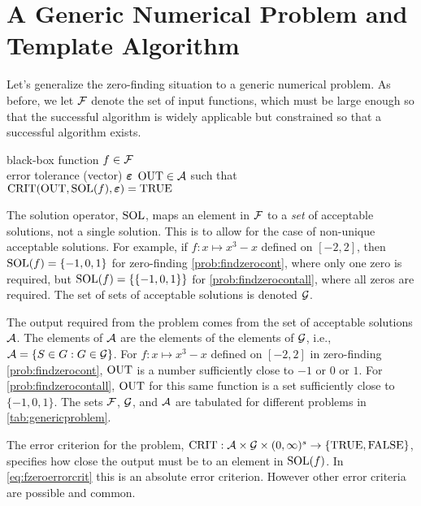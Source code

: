 \section{A Generic Numerical Problem and Template Algorithm}

Let's generalize the zero-finding situation to a generic numerical problem.  As before, we let $\mathcal{F}$ denote the set of input functions, which must be large enough so that the successful algorithm is widely applicable but constrained so that a successful algorithm exists. 

\begin{NumProblem}
\label{prob:generalProblem}
{black-box function $f \in \mathcal{F}$ \\ error tolerance (vector) $\boldsymbol{\varepsilon}$}
{$\operatorname{OUT} \in \mathcal{A}$ such that \\ \qquad $\operatorname{CRIT}(\operatorname{OUT},\operatorname{SOL}(f),\boldsymbol{\varepsilon}) = \textup{TRUE}$}
\end{NumProblem}

The solution operator, $\operatorname{SOL}$, maps an element in $\mathcal{F}$ to a \emph{set} of acceptable solutions, not a single solution. This is to allow for the case of non-unique acceptable solutions. For example, if $f: x \mapsto x^3 - x$ defined on $[-2,2]$, then $\operatorname{SOL}(f) = \{-1, 0, 1\}$ for zero-finding \cref{prob:findzerocont}, where only one zero is required, but  $\operatorname{SOL}(f) = \{ \{-1, 0, 1\} \}$ for \cref{prob:findzerocontall}, where all zeros are required.  The set of sets of acceptable solutions is denoted $\mathcal{G}$.

The output required from the problem comes from the set of acceptable solutions $\mathcal{A}$.  The elements of $\mathcal{A}$ are the elements of the elements of $\mathcal{G}$, i.e., $\mathcal{A} = \{S \in G : G \in \mathcal{G}\}$.  For $f: x \mapsto x^3 - x$ defined on $[-2,2]$ in zero-finding \cref{prob:findzerocont}, $\operatorname{OUT}$ is a number sufficiently close to $-1$ or $0$ or $1$.  For \cref{prob:findzerocontall}, $\operatorname{OUT}$ for this same function is a set sufficiently close to  $\{-1, 0, 1\}$.  The sets $\mathcal{F}$, $\mathcal{G}$, and $\mathcal{A}$ are tabulated for different problems in \cref{tab:genericproblem}.

The error criterion for the problem, $\operatorname{CRIT}: \mathcal{A} \times \mathcal{G} \times (0,\infty)^s \to \{\textup{TRUE}, \textup{FALSE}\}$, specifies how close the output must be to an element in $\operatorname{SOL}(f)$.  In \eqref{eq:fzeroerrorcrit} this is an absolute error criterion.  However other error criteria are possible and common.


